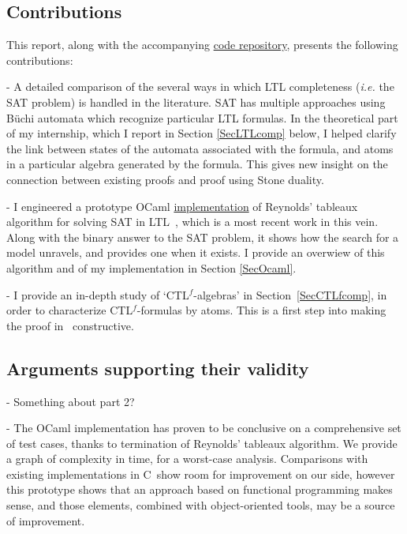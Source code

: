 \documentclass[11pt]{article}
\newcommand{\CTLf}{{CTL$^f$}}
\def\CC{{C\nolinebreak[4]\hspace{-.05em}\raisebox{.4ex}{\tiny\bf ++}}}
\theoremstyle{definition}
\begin{document}
\subsection*{Contributions}
This report, along with the accompanying \href{https://github.com/anatcaramba/LTL-SAT-Solver-by-Reynolds-Tableaux}{code repository},
presents the following contributions:

- A detailed comparison of the several ways in which
LTL completeness
(\emph{i.e.} the SAT problem) is handled
in the literature. SAT has 
multiple approaches using Büchi automata which recognize particular
LTL formulas. In the theoretical part
of my internship, which I report in Section \ref*{SecLTLcomp} below,
I helped clarify the link between states
of the automata associated with the formula,
and atoms in a particular algebra generated by the formula.
This gives new insight on the connection between existing proofs
and proof using Stone duality.


- I engineered a prototype OCaml \href{https://github.com/anatcaramba/LTL-SAT-Solver-by-Reynolds-Tableaux}{implementation} 
of Reynolds' tableaux
algorithm for solving SAT in LTL~\cite{ReyLTL}, which is a most recent work in this vein.
Along with the binary answer to the SAT problem, it shows how
the search for a model unravels, and provides one when it exists.
I provide an overwiew of this algorithm and of my implementation in 
Section \ref*{SecOcaml}.

- I provide an in-depth study of `{\CTLf}-algebras' in 
Section~\ref*{SecCTLfcomp}, 
in order to characterize
{\CTLf}-formulas by atoms. This is a first step into making the 
proof in~\cite{GhivG16} constructive.



\subsection*{Arguments supporting their validity}

- Something about part 2?

- The OCaml implementation has proven to be conclusive on a comprehensive set of test cases, 
thanks to termination of Reynolds' tableaux algorithm. We provide a graph of complexity in time,
for a worst-case analysis. Comparisons with existing implementations in \CC~show room for improvement on our side,
however this prototype shows that an approach based on functional programming makes sense, and those elements,
combined with object-oriented tools, may be a source of improvement.
\end{document}
